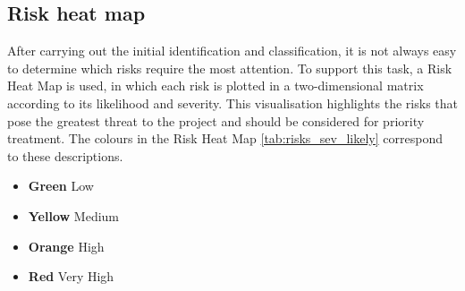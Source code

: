 \subsection*{Risk heat map}
After carrying out the initial identification and classification, it is not always easy to determine which risks require the most attention. To support this task, a Risk Heat Map is used, in which each risk is plotted in a two-dimensional matrix according to its likelihood and severity. This visualisation highlights the risks that pose the greatest threat to the project and should be considered for priority treatment. The colours in the Risk Heat Map \ref{tab:risks_sev_likely} correspond to these descriptions.


\begin{itemize}
    \item \textbf{Green} Low
    \item \textbf{Yellow} Medium
    \item \textbf{Orange} High
    \item \textbf{Red} Very High
\end{itemize}





